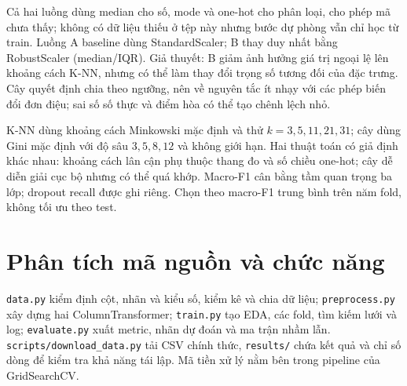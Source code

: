 \documentclass[11pt,a4paper]{article}
\begin{document}
Cả hai luồng dùng median cho số, mode và one-hot cho phân loại, cho phép mã chưa thấy; không có dữ liệu thiếu ở tệp này nhưng bước dự phòng vẫn chỉ học từ train. Luồng A baseline dùng StandardScaler; B thay duy nhất bằng RobustScaler (median/IQR). Giả thuyết: B giảm ảnh hưởng giá trị ngoại lệ lên khoảng cách K-NN, nhưng có thể làm thay đổi trọng số tương đối của đặc trưng. Cây quyết định chia theo ngưỡng, nên về nguyên tắc ít nhạy với các phép biến đổi đơn điệu; sai số số thực và điểm hòa có thể tạo chênh lệch nhỏ.

K-NN dùng khoảng cách Minkowski mặc định và thử $k=3,5,11,21,31$; cây dùng Gini mặc định với độ sâu $3,5,8,12$ và không giới hạn. Hai thuật toán có giả định khác nhau: khoảng cách lân cận phụ thuộc thang đo và số chiều one-hot; cây dễ diễn giải cục bộ nhưng có thể quá khớp. Macro-F1 cân bằng tầm quan trọng ba lớp; dropout recall được ghi riêng. Chọn theo macro-F1 trung bình trên năm fold, không tối ưu theo test.

\section{Phân tích mã nguồn và chức năng}
\texttt{data.py} kiểm định cột, nhãn và kiểu số, kiểm kê và chia dữ liệu; \texttt{preprocess.py} xây dựng hai ColumnTransformer; \texttt{train.py} tạo EDA, các fold, tìm kiếm lưới và log; \texttt{evaluate.py} xuất metric, nhãn dự đoán và ma trận nhầm lẫn. \texttt{scripts/download\_data.py} tải CSV chính thức, \texttt{results/} chứa kết quả và chỉ số dòng để kiểm tra khả năng tái lập. Mã tiền xử lý nằm bên trong pipeline của GridSearchCV.
\end{document}
